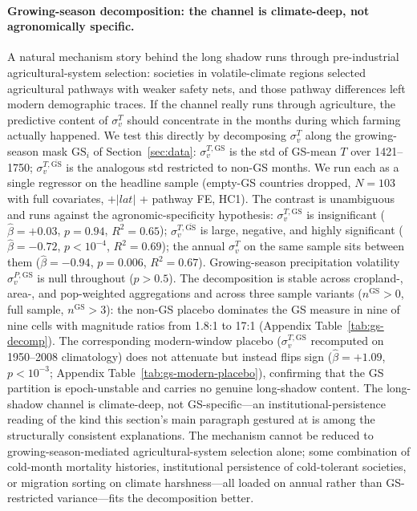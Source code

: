 \documentclass[11pt,letterpaper]{article}
\begin{document}
\paragraph{Growing-season decomposition: the channel is climate-deep, not agronomically specific.}
A natural mechanism story behind the long shadow runs through pre-industrial agricultural-system selection: societies in volatile-climate regions selected agricultural pathways with weaker safety nets, and those pathway differences left modern demographic traces. If the channel really runs through agriculture, the predictive content of $\sigma_v^T$ should concentrate in the months during which farming actually happened. We test this directly by decomposing $\sigma_v^T$ along the growing-season mask $\mathrm{GS}_i$ of Section~\ref{sec:data}: $\sigma_v^{T,\mathrm{GS}}$ is the std of GS-mean $T$ over 1421--1750; $\sigma_v^{T,\overline{\mathrm{GS}}}$ is the analogous std restricted to non-GS months. We run each as a single regressor on the headline sample (empty-GS countries dropped, $N=103$ with full covariates, $+|lat|$ + pathway FE, HC1). The contrast is unambiguous and runs against the agronomic-specificity hypothesis: $\sigma_v^{T,\mathrm{GS}}$ is insignificant ($\hat\beta = +0.03$, $p=0.94$, $R^2=0.65$); $\sigma_v^{T,\overline{\mathrm{GS}}}$ is large, negative, and highly significant ($\hat\beta = -0.72$, $p < 10^{-4}$, $R^2=0.69$); the annual $\sigma_v^T$ on the same sample sits between them ($\hat\beta = -0.94$, $p=0.006$, $R^2=0.67$). Growing-season precipitation volatility $\sigma_v^{P,\mathrm{GS}}$ is null throughout ($p > 0.5$). The decomposition is stable across cropland-, area-, and pop-weighted aggregations and across three sample variants ($n^{\mathrm{GS}}{>}0$, full sample, $n^{\mathrm{GS}}{>}3$): the non-GS placebo dominates the GS measure in nine of nine cells with magnitude ratios from 1.8:1 to 17:1 (Appendix Table~\ref{tab:gs-decomp}). The corresponding modern-window placebo ($\sigma_v^{T,\mathrm{GS}}$ recomputed on 1950--2008 climatology) does not attenuate but instead flips sign ($\hat\beta = +1.09$, $p < 10^{-3}$; Appendix Table~\ref{tab:gs-modern-placebo}), confirming that the GS partition is epoch-unstable and carries no genuine long-shadow content. The long-shadow channel is climate-deep, not GS-specific---an institutional-persistence reading of the kind this section's main paragraph gestured at is among the structurally consistent explanations. The mechanism cannot be reduced to growing-season-mediated agricultural-system selection alone; some combination of cold-month mortality histories, institutional persistence of cold-tolerant societies, or migration sorting on climate harshness---all loaded on annual rather than GS-restricted variance---fits the decomposition better.
\end{document}
